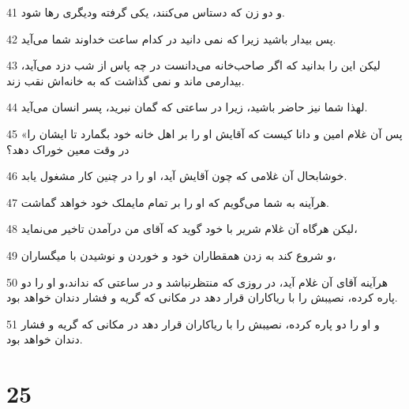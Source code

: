 \par 41 و دو زن که دستاس می‌کنند، یکی گرفته ودیگری رها شود.
\par 42 پس بیدار باشید زیرا که نمی دانید در کدام ساعت خداوند شما می‌آید.
\par 43 لیکن این را بدانید که اگر صاحب‌خانه می‌دانست در چه پاس از شب دزد می‌آید، بیدارمی ماند و نمی گذاشت که به خانه‌اش نقب زند.
\par 44 لهذا شما نیز حاضر باشید، زیرا در ساعتی که گمان نبرید، پسر انسان می‌آید.
\par 45 «پس آن غلام امین و دانا کیست که آقایش او را بر اهل خانه خود بگمارد تا ایشان را در وقت معین خوراک دهد؟
\par 46 خوشابحال آن غلامی که چون آقایش آید، او را در چنین کار مشغول یابد.
\par 47 هرآینه به شما می‌گویم که او را بر تمام مایملک خود خواهد گماشت.
\par 48 لیکن هرگاه آن غلام شریر با خود گوید که آقای من در‌آمدن تاخیر می‌نماید،
\par 49 و شروع کند به زدن همقطاران خود و خوردن و نوشیدن با میگساران،
\par 50 هرآینه آقای آن غلام آید، در روزی که منتظرنباشد و در ساعتی که نداند،و او را دو پاره کرده، نصیبش را با ریاکاران قرار دهد در مکانی که گریه و فشار دندان خواهد بود.
\par 51 و او را دو پاره کرده، نصیبش را با ریاکاران قرار دهد در مکانی که گریه و فشار دندان خواهد بود.

\chapter{25}

